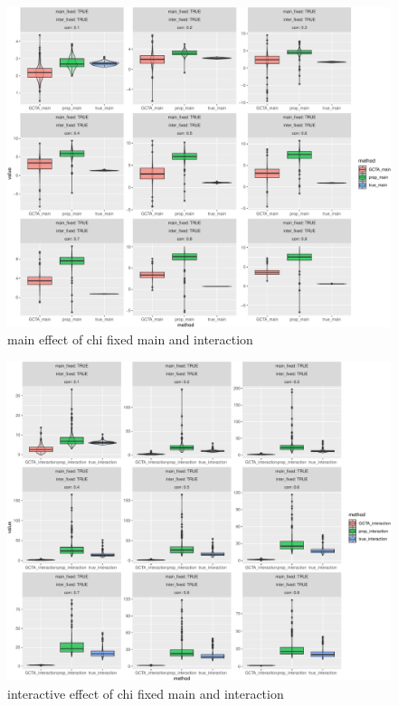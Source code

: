 \documentclass[]{article}
\begin{document}
\begin{figure}
\centering
\includegraphics{Simulation_report_files/figure-latex/main_fixed_fixed_chi-1.pdf}
\caption{main effect of chi fixed main and interaction}
\end{figure}

\begin{figure}
\centering
\includegraphics{Simulation_report_files/figure-latex/inter_fixed_fixed_chi-1.pdf}
\caption{interactive effect of chi fixed main and interaction}
\end{figure}
\end{document}
